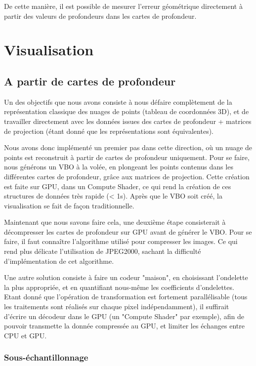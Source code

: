 \documentclass{report}
\begin{document}
De cette manière, il est possible de mesurer l'erreur géométrique directement à partir des valeurs de profondeurs dans les cartes de profondeur.

\chapter{Visualisation}

\section{A partir de cartes de profondeur}

Un des objectifs que nous avons consiste à nous défaire complètement de la représentation classique des nuages de points (tableau de coordonnées 3D), et de travailler directement avec les données issues des cartes de profondeur + matrices de projection (étant donné que les représentations sont équivalentes).

Nous avons donc implémenté un premier pas dans cette direction, où un nuage de points est reconstruit à partir de cartes de profondeur uniquement.
Pour se faire, nous générons un VBO à la volée, en plongeant les points contenus dans les différentes cartes de profondeur, grâce aux matrices de projection.
Cette création est faite sur GPU, dans un Compute Shader, ce qui rend la création de ces structures de données très rapide (< 1s).
Après que le VBO soit créé, la visualisation se fait de façon traditionnelle.

Maintenant que nous savons faire cela, une deuxième étape consisterait à décompresser les cartes de profondeur sur GPU avant de générer le VBO.
Pour se faire, il faut connaître l'algorithme utilisé pour compresser les images. Ce qui rend plus délicate l'utilisation de JPEG2000, sachant la difficulté d'implémentation de cet algorithme.

Une autre solution consiste à faire un codeur "maison", en choisissant l'ondelette la plus appropriée, et en quantifiant nous-même les coefficients d'ondelettes.
Etant donné que l'opération de transformation est fortement parallélisable (tous les traitements sont réalisés sur chaque pixel indépendamment), il suffirait d'écrire un décodeur dans le GPU (un "Compute Shader" par exemple), afin de pouvoir transmette la donnée compressée au GPU, et limiter les échanges entre CPU et GPU.

\subsection{Sous-échantillonnage}
\label{subs:sous_echantillonnage}
\end{document}
